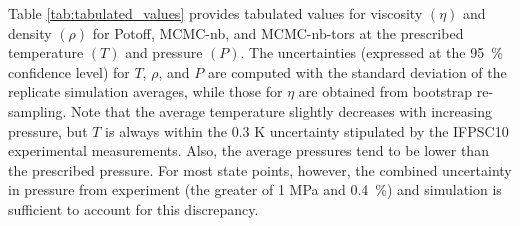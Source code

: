 \documentclass[preprint,review,12pt]{elsarticle}
\begin{document}
	Table \ref{tab:tabulated_values} provides tabulated values for viscosity $(\eta)$ and density $(\rho)$ for Potoff, MCMC-nb, and MCMC-nb-tors at the prescribed temperature $(T)$ and pressure $(P)$. The uncertainties (expressed at the 95~\% confidence level) for $T$, $\rho$, and $P$ are computed with the standard deviation of the replicate simulation averages, while those for $\eta$ are obtained from bootstrap re-sampling. Note that the average temperature slightly decreases with increasing pressure, but $T$ is always within the 0.3 K uncertainty stipulated by the IFPSC10 experimental measurements. Also, the average pressures tend to be lower than the prescribed pressure. For most state points, however, the combined uncertainty in pressure from experiment (the greater of 1 MPa and 0.4~\%) and simulation is sufficient to account for this discrepancy. 
	
\end{document}
